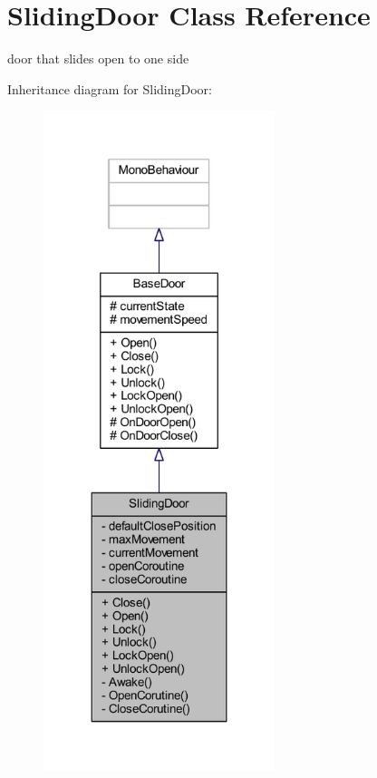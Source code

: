 \hypertarget{class_sliding_door}{}\section{Sliding\+Door Class Reference}
\label{class_sliding_door}


door that slides open to one side  




Inheritance diagram for Sliding\+Door\+:
\nopagebreak
\begin{figure}[H]
\begin{center}
\leavevmode
\includegraphics[width=191pt]{class_sliding_door__inherit__graph}
\end{center}
\end{figure}


